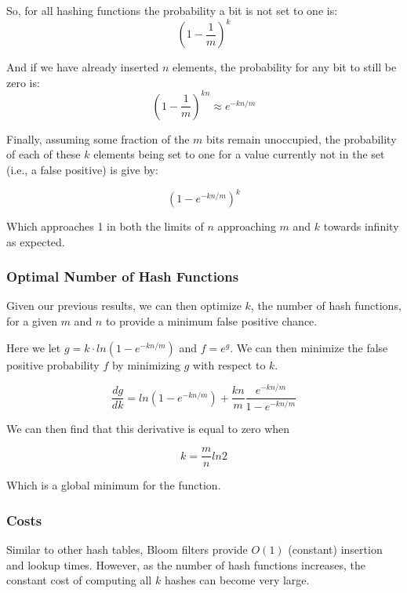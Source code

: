 \documentclass[twoside]{article}
\begin{document}
So, for all hashing functions the probability a bit is not set to one is:
\begin{equation}
\left(1 - \frac{1}{m} \right)^k
\end{equation}

And if we have already inserted $n$ elements, the probability for any bit to still be zero is:
\begin{equation}
\left(1 - \frac{1}{m} \right)^{kn} \approx e^{-kn/m}
\end{equation}

Finally, assuming some fraction of the $m$ bits remain unoccupied, the probability of each of these $k$ elements being set to one for a value currently not in the set (i.e., a false positive) is give by:

\begin{equation}
(1 - e^{-kn/m})^k
\end{equation}

Which approaches 1 in both the limits of $n$ approaching $m$ and $k$ towards infinity as expected.

\subsubsection{Optimal Number of Hash Functions}

Given our previous results, we can then optimize $k$, the number of hash functions, for a given $m$ and $n$ to provide a minimum false positive chance. 

Here we let $g = k\cdot ln(1 - e^{-kn/m})$ and $f = e^g$. We can then minimize the false positive probability $f$ by minimizing $g$ with respect to $k$.

\begin{equation}
\frac{dg}{dk} = ln(1-e^{-kn/m}) + \frac{kn}{m}\frac{e^{-kn/m}}{1-e^{-kn/m}}
\end{equation}

We can then find that this derivative is equal to zero when

\begin{equation}
k = \frac{m}{n}ln2
\end{equation}

Which is a global minimum for the function.

\subsubsection{Costs} 

Similar to other hash tables, Bloom filters provide $O(1)$ (constant) insertion and lookup times. However, as the number of hash functions increases, the constant cost of computing all $k$ hashes can become very large.
\end{document}
